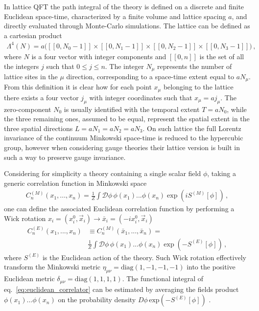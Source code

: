 %
In lattice QFT the path integral of the theory is defined on a discrete and finite Euclidean space-time,
characterized by a finite volume and lattice spacing $a$, and directly evaluated through Monte-Carlo simulations.
The lattice can be defined as a cartesian product
\begin{align}
    \label{eq:lattice_def}
    \Lambda^4\left(N\right) = a\Big([\![0, N_0-1 ]\!]\times[\![0, N_1-1 ]\!]\times[\![0, N_2-1 ]\!]
    \times[\![0, N_3-1 ]\!] \Big)\,,
\end{align}
where $N$ is a four vector with integer components and $[\![0, n ]\!]$ is the set of all the integers $j$ such that
$0 \le j \le n$. The integer $N_{\mu}$ represents the number of lattice sites in the $\mu$ direction, corresponding
to a space-time extent equal to $a N_{\mu}$. 
From this definition it is clear how for each point $x_{\mu}$ belonging to the lattice there exists a four vector $j_{\mu}$ 
with integer coordinates such that $x_{\mu} = a j_{\mu}$. 
The zero-component $N_0$ is usually identified with the temporal extent
$T = a N_0$, while the three remaining ones, assumed to be equal, represent the spatial extent in the three spatial directions
$L = a N_1 = a N_2 = a N_3$. On such lattice the full Lorentz invariance of the continuum 
Minkowski space-time is reduced to the hypercubic group, 
however when considering gauge theories their lattice version is built in such a way to preserve gauge invariance. 

Considering for simplicity a theory containing a single scalar field $\phi$,
taking a generic correlation function in Minkowski space 
\begin{align}
    C_n^{(M)}\left(x_1,..., x_n\right) = 
    \frac{1}{Z} \int \mathcal{D}\phi\, \phi\left(x_1\right)...\phi\left(x_n\right)\exp\left(i S^{(M)}\left[\phi\right]\right)\,,
\end{align}
one can define the associated Euclidean correlation function
by performing a Wick rotation $x_i = \left(x^0_i, \vec{x}_i\right) \rightarrow \bar{x}_i = \left(-i x^0_i, \vec{x}_i\right)$
\begin{align}
    \label{eq:euclidean_correlator}
    C_n^{(E)}\left(x_1,..., x_n\right) &\equiv C_n^{(M)}\left(\bar{x}_1,..., \bar{x}_n\right) = \nonumber \\
    &\frac{1}{Z} \int \mathcal{D}\phi\, \phi\left(x_1\right)...\phi\left(x_n\right)\exp\left(- S^{(E)}\left[\phi\right]\right)\,,
\end{align}
where $S^{(E)}$ is the Euclidean action of the theory.
Such Wick rotation effectively transform the Minkowski metric $\eta_{\mu\nu} = \text{diag}\left(1,-1,-1,-1\right)$
into the positive Euclidean metric $\delta_{\mu\nu} = \text{diag}\left(1,1,1,1\right)$.
The functional integral of eq.~\eqref{eq:euclidean_correlator} can be estimated
by averaging the fields product $\phi\left(x_1\right)...\phi\left(x_n\right)$ on the probability density 
$D\phi \, \text{exp}\left(-S^{(E)}\left[\phi\right]\right)$ .


